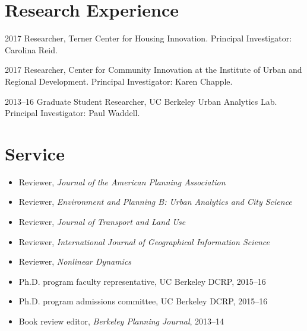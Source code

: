 \documentclass{academiccv}
\begin{document}
\section*{Research Experience}

\begin{tablist}
	
\item[2017] 	\tab Researcher, Terner Center for Housing Innovation. Principal Investigator: Carolina Reid.

\item[2017] 	\tab Researcher, Center for Community Innovation at the Institute of Urban and Regional Development. Principal Investigator: Karen Chapple.

\item[2013--16] \tab Graduate Student Researcher, UC Berkeley Urban Analytics Lab. Principal Investigator: Paul Waddell.

\end{tablist}



\section*{Service}

\begin{itemize}

\item Reviewer, \emph{Journal of the American Planning Association}

\item Reviewer, \emph{Environment and Planning B: Urban Analytics and City Science}

\item Reviewer, \emph{Journal of Transport and Land Use}

\item Reviewer, \emph{International Journal of Geographical Information Science}

\item Reviewer, \emph{Nonlinear Dynamics}

\item Ph.D. program faculty representative, UC Berkeley DCRP, 2015--16

\item Ph.D. program admissions committee, UC Berkeley DCRP, 2015--16

\item Book review editor, \emph{Berkeley Planning Journal}, 2013--14

\end{itemize}
\end{document}
